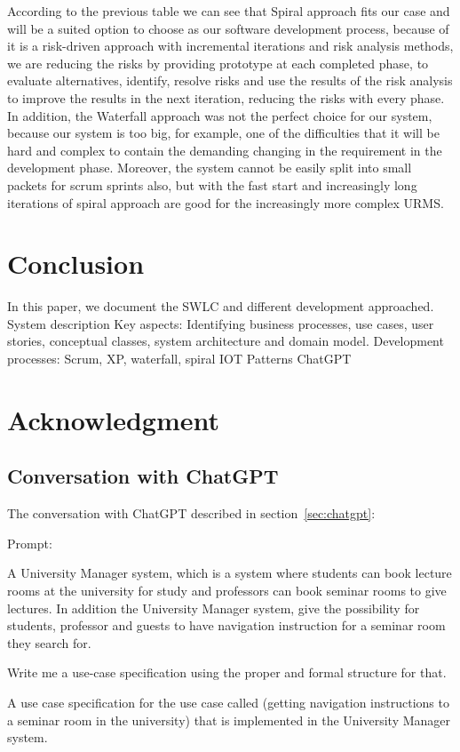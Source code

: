 \documentclass[conference,onecolumn]{IEEEtran}
\begin{document}
	According to the previous table we can see that Spiral approach fits our case and will be a suited option to choose as our software development process, because of it is a risk-driven approach with incremental iterations and risk analysis methods, we are reducing the risks by providing prototype at each completed phase, to evaluate alternatives, identify, resolve risks and use the results of the risk analysis to improve the results in the next iteration, reducing the risks with every phase. In addition, the Waterfall approach was not the perfect choice for our system, because our system is too big, for example, one of the difficulties that it will be hard and complex to contain the demanding changing in the requirement in the development phase. Moreover, the system cannot be easily split into small packets for scrum sprints also, but with the fast start and increasingly long iterations of spiral approach are good for the increasingly more complex URMS.


\section{Conclusion}
	In this paper, we document the SWLC and different development approached.
	System description
	Key aspects: Identifying business processes, use cases, user stories, conceptual classes, system architecture and domain model.
	Development processes: Scrum, XP, waterfall, spiral
	IOT Patterns
	ChatGPT


\section*{Acknowledgment}

\newpage
\appendix

\subsection{Conversation with ChatGPT} \label{appdx:chatgpt}
 
The conversation with ChatGPT described in section~\ref{sec:chatgpt}:

Prompt:
\begin{framed}
	\small
	A University Manager system, which is a system where students can book lecture rooms at the university for study and professors can book seminar rooms to give lectures. In addition the University Manager system, give the possibility for students, professor and guests  to have navigation instruction for a seminar room they search for.
	
	Write me a use-case specification using the proper and formal structure for that.
	
	A use case specification for the use case called (getting navigation instructions to a seminar room in the university) that is implemented in the University Manager system.
\end{framed}
\end{document}
